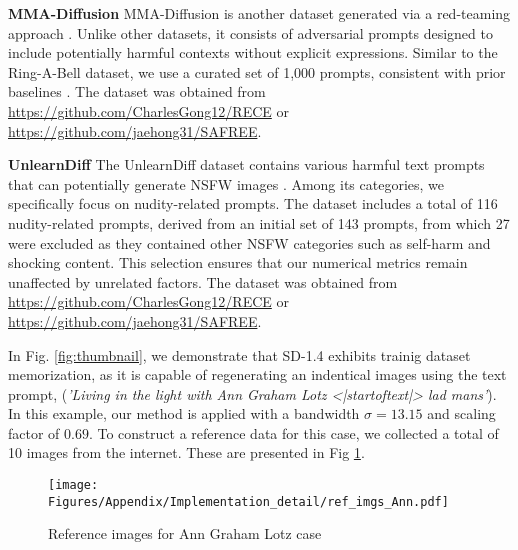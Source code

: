 \textbf{MMA-Diffusion}
MMA-Diffusion is another dataset generated via a red-teaming approach \cite{yang2024mma}. 
Unlike other datasets, it consists of adversarial prompts designed to include potentially harmful contexts without explicit expressions. 
Similar to the Ring-A-Bell dataset, we use a curated set of 1,000 prompts, consistent with prior baselines \cite{gong2024reliable, yoon2024safree}. 
The dataset was obtained from \url{https://github.com/CharlesGong12/RECE} or \url{https://github.com/jaehong31/SAFREE}.

\textbf{UnlearnDiff}
The UnlearnDiff dataset contains various harmful text prompts that can potentially generate NSFW images \cite{zhang2024generate}. 
Among its categories, we specifically focus on nudity-related prompts. 
The dataset includes a total of 116 nudity-related prompts, derived from an initial set of 143 prompts, from which 27 were excluded as they contained other NSFW categories such as self-harm and shocking content. 
This selection ensures that our numerical metrics remain unaffected by unrelated factors.
The dataset was obtained from \url{https://github.com/CharlesGong12/RECE} or \url{https://github.com/jaehong31/SAFREE}.

In Fig. \ref{fig:thumbnail}, we demonstrate that SD-1.4 exhibits trainig dataset memorization, as it is capable of regenerating an indentical images using the text prompt, (\textit{'Living in the light with Ann Graham Lotz <|startoftext|> lad mans'}). In this example, our method is applied with a bandwidth $\sigma=13.15$ and scaling factor of $0.69$. To construct a reference data for this case, we collected a total of 10 images from the internet. These are presented in Fig \ref{fig:ann_ref_imgs}. 
\begin{figure}[h]
    \centering
    \texttt{[image: Figures/Appendix/Implementation\_detail/ref\_imgs\_Ann.pdf]}
    \caption{Reference images for Ann Graham Lotz case}
    \label{fig:ann_ref_imgs}
\end{figure}

